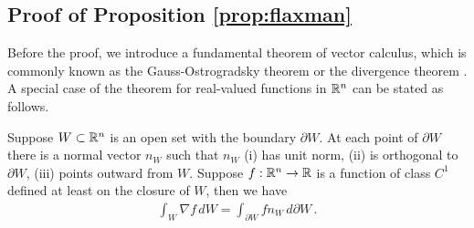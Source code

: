 
\subsection{Proof of Proposition \ref{prop:flaxman}}
Before the proof, we introduce a fundamental theorem of vector calculus, which is commonly known as the Gauss-Ostrogradsky theorem or the divergence theorem . A special case of the theorem for real-valued functions in $\mathbb{R}^n$ can be stated as follows.
\begin{lemma}
\label{lem:gradientCalculus}
Suppose $W \subset \mathbb{R}^n$ is an open set with the boundary $\partial W$. At each point of $\partial W$ there is a normal vector $n_W$ such that $n_W$  (i) has unit norm, (ii) is orthogonal to $\partial W$, (iii) points outward from $W$. Suppose $f: \mathbb{R}^n\to \mathbb{R}$ is a function of class $C^1$ defined at least on the closure of $W$, then we have
\begin{align*}
\int_{ W} \nabla f\,d W = \int_{\partial W} f n_W \,d \partial W \,.
\end{align*}
\end{lemma}

